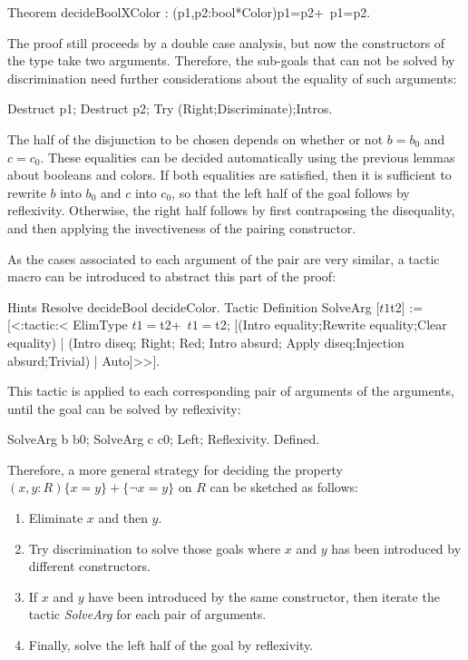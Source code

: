 \begin{coq_example*}
Theorem decideBoolXColor : (p1,p2:bool*Color){p1=p2}+{~p1=p2}.
\end{coq_example*}

The proof still proceeds by a double case analysis, but now the
constructors of the type take two arguments. Therefore, the sub-goals
that can not be solved by discrimination need further considerations
about the equality of such arguments:

\begin{coq_example}
  Destruct p1;
    Destruct p2; Try (Right;Discriminate);Intros.
\end{coq_example}

The half of the disjunction to be chosen depends on whether or not
$b=b_0$ and $c=c_0$. These equalities can be decided automatically
using the previous lemmas about booleans and colors. If both
equalities are satisfied, then it is sufficient to rewrite $b$ into
$b_0$ and $c$ into $c_0$, so that the left half of the goal follows by
reflexivity.  Otherwise, the right half follows by first contraposing
the disequality, and then applying the invectiveness of the pairing
constructor.

As the cases associated to each argument of the pair are very similar,
a tactic macro can be introduced to abstract this part of the proof:

\begin{coq_example*}
Hints Resolve decideBool decideColor.
Tactic Definition SolveArg [$t1 $t2] := 
 [<:tactic:<
   ElimType {$t1=$t2}+{~$t1=$t2};
   [(Intro equality;Rewrite equality;Clear equality) |
    (Intro diseq; Right; Red; Intro absurd;
     Apply diseq;Injection absurd;Trivial) |
    Auto]>>].
\end{coq_example*}

This tactic is applied to each corresponding pair of arguments of the
arguments, until the goal can be solved by reflexivity:

\begin{coq_example*}
SolveArg b b0;
  SolveArg c c0;
    Left; Reflexivity.
Defined.
\end{coq_example*}

Therefore, a more general strategy for deciding the property 
$(x,y:R)\{x=y\}+\{\neg x =y\}$ on $R$ can be sketched as follows:
\begin{enumerate}
\item Eliminate $x$ and then $y$.
\item Try discrimination to solve those goals where $x$ and $y$ has
been introduced by different constructors.
\item If $x$ and $y$ have been introduced by the same constructor,
then iterate the tactic \textsl{SolveArg} for each pair of
arguments. 
\item Finally, solve the left half of the goal by reflexivity.
\end{enumerate}

